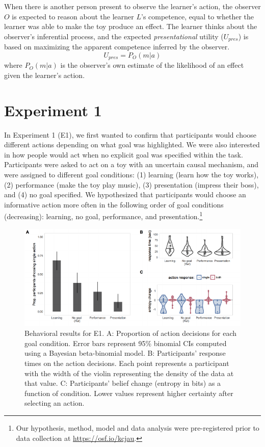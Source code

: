 \documentclass[10pt, letterpaper]{article}
\newenvironment{CodeChunk}{}{}
\begin{document}
When there is another person present to observe the learner's action,
the observer \(O\) is expected to reason about the learner \(L\)'s
competence, equal to whether the learner was able to make the toy
produce an effect. The learner thinks about the observer's inferential
process, and the expected \emph{presentational} utility (\(U_{pres}\))
is based on maximizing the apparent competence inferred by the observer.
\[ U_{pres} = P_O(m | a)\] \noindent
where \(P_O(m | a)\) is the observer's own estimate of the likelihood of
an effect given the learner's action.

\section{Experiment 1}\label{experiment-1}

In Experiment 1 (E1), we first wanted to confirm that participants would
choose different actions depending on what goal was highlighted. We were
also interested in how people would act when no explicit goal was
specified within the task. Participants were asked to act on a toy with
an uncertain causal mechanism, and were assigned to different goal
conditions: (1) learning (learn how the toy works), (2) performance
(make the toy play music), (3) presentation (impress their boss), and
(4) no goal specified. We hypothesized that participants would choose an
informative action more often in the following order of goal conditions
(decreasing): learning, no goal, performance, and
presentation.\footnote{Our hypothesis, method, model and data analysis were pre-registered prior to data collection at \url{https://osf.io/kcjau}.}

\begin{CodeChunk}
\begin{figure}[tb]

{\centering \includegraphics[width=0.95\linewidth]{figs/e1_behav_results_plot-1} 

}

\caption[Behavioral results for E1]{Behavioral results for E1. A: Proportion of action decisions for each goal condition. Error bars represent 95\% binomial CIs computed using a Bayesian beta-binomial model. B: Participants' response times on the action decisions. Each point represents a participant with the width of the violin representing the density of the data at that value. C: Participants' belief change (entropy in bits) as a function of condition. Lower values represent higher certainty after selecting an action.}\label{fig:e1_behav_results_plot}
\end{figure}
\end{CodeChunk}
\end{document}
